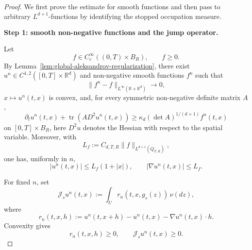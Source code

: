 \documentclass[10pt,a4paper]{amsart}
\begin{document}
\begin{proof}
	We first prove the estimate for smooth functions and then pass to
	arbitrary \(L^{d+1}\)-functions by identifying the stopped occupation
	measure.
	
	
	\textbf{Step 1: smooth non-negative functions and the jump operator.}
	
	Let
	\[
	f\in C_c^\infty((0,T)\times B_R),
	\qquad
	f\geq0.
	\]
	By Lemma~\ref{lem:global-aleksandrov-regularization}, there exist
	\(u^n\in C^{1,2}([0,T]\times\mathbb R^d)\) and non-negative smooth
	functions \(f^n\) such that
	\begin{equation}
		\label{eq:regularized-f-convergence}
		\|f^n-f\|_{L^\infty(\mathbb R\times\mathbb R^d)}
		\longrightarrow0,
	\end{equation}
	\(x\mapsto u^n(t,x)\) is convex, and, for every symmetric
	non-negative definite matrix \(A\),
	\begin{equation}
		\label{eq:regularized-aleksandrov-inequality}
		\partial_tu^n(t,x)
		+\operatorname{tr}\!\left(A D^2u^n(t,x)\right)
		\geq
		\kappa_d(\det A)^{1/(d+1)}f^n(t,x)
	\end{equation}
	on \([0,T]\times B_R\), here \(D^2u\) denotes the Hessian with respect to the spatial variable. Moreover, with
	\[
	L_f
	:=
	C_{d,T,R}\|f\|_{L^{d+1}(Q_{T,R})},
	\]
	one has, uniformly in \(n\),
	\begin{equation}
		\label{eq:regularized-growth-gradient-bounds}
		|u^n(t,x)|
		\leq
		L_f(1+|x|),
		\qquad
		|\nabla u^n(t,x)|
		\leq
		L_f.
	\end{equation}
	
	For fixed \(n\), set
	\begin{equation}
		\label{eq:jump-operator}
		\mathcal J_su^n(t,x)
		:=
		\int_U r_n(t,x,g_s(z))\,\nu(dz),
	\end{equation}
	where
	\[
	r_n(t,x,h)
	:=
	u^n(t,x+h)-u^n(t,x)-\nabla u^n(t,x)\cdot h.
	\]
	Convexity gives
	\begin{equation}
		\label{eq:jump-operator-positive}
		r_n(t,x,h)\geq0,
		\qquad
		\mathcal J_su^n(t,x)\geq0.
	\end{equation}
	

\end{proof}
\end{document}
